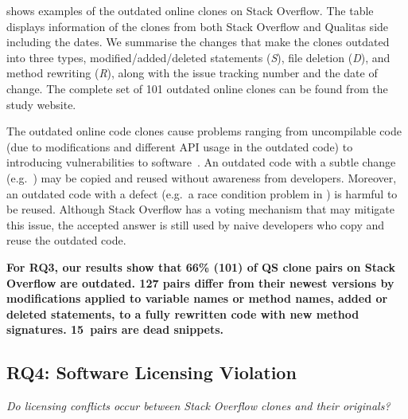\documentclass[10pt,journal,compsoc]{IEEEtran}
\begin{document}
 shows examples of the outdated online clones on
Stack Overflow. The table displays information of the clones from both Stack
Overflow and Qualitas side including the dates. We summarise the changes that
make the clones outdated into three types, modified/added/deleted statements
(\textit{S}), file deletion (\textit{D}), and method rewriting (\textit{R}),
along with the issue tracking number and the date of change. The complete set of
101 outdated online clones can be found from the study website.

The outdated online code clones cause problems ranging from uncompilable code
(due to modifications and different API usage in the outdated code) to
introducing vulnerabilities to software~\cite{Xia2014}. An outdated code with a
subtle change (e.g.~) may be copied and reused without
awareness from developers. Moreover, an outdated code with a defect
(e.g.~a race condition problem in ) is harmful to be reused. Although Stack
Overflow has a voting mechanism that may mitigate this issue, the accepted
answer is still used by naive developers who copy and reuse the outdated code.

\textbf{For RQ3, our results show that 66\% (101) of QS clone pairs on Stack
	Overflow are outdated. 127 pairs differ from their newest versions by
	modifications applied to variable names or method names, added or deleted
	statements, to a fully rewritten code with new method signatures. 15~pairs are
	dead snippets.}

\subsection{RQ4: Software Licensing Violation}
\vspace{0.25cm}
\textit{Do
	licensing conflicts occur between Stack Overflow clones and their
	originals?}
\vspace{0.25cm}
\end{document}
